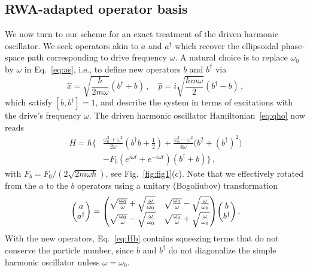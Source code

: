 \subsection{RWA-adapted operator basis}
We now turn to our scheme for an exact treatment of the driven harmonic oscillator. We seek operators akin to $a$ and $a^\dagger$ which recover the ellipsoidal phase-space path corresponding to drive frequency $\omega$. A natural choice is to replace $\omega_0$ by $\omega$ in Eq.~\eqref{eq:as}, i.e., to define new operators $b$ and $b^\dagger$ via
\begin{equation} \label{eq:bs}
\hat{x} =\sqrt{\frac{\hbar}{2m\omega}}(b^\dagger+b)\,, \quad \hat{p} = i\sqrt{\frac{\hbar m \omega}{2}}(b^\dagger - b)\,,
\end{equation}
which satisfy $[b, b^\dagger]=1$, and describe the system in terms of excitations with the drive's frequency $\omega$. The driven harmonic oscillator Hamiltonian~\eqref{eq:qho} now reads
\begin{align} 
H = \hbar \bigg\{ &\frac{\omega_0^2 + \omega^2}{2 \omega}  \left (b^\dagger b + \frac{1}{2} \right)+ \frac{\omega_0^2  - \omega^2}{4 \omega} \big(b^2 + (b^\dagger)^2  \big)\nonumber
\\ &- F_b(e^{i\omega t} +e^{-i\omega t})(b^\dagger+b) \bigg\} \,,\label{eq:Hb}
\end{align}
with $F_b = F_0 / (2 \sqrt{2 m \omega \hbar})$, see Fig.~\ref{fig:fig1}(c). Note that we effectively rotated from the $a$ to the $b$ operators using a unitary (Bogoliubov) transformation~\cite{Xiao_2009}
\begin{equation}
\mqty(a \\ a^\dagger) = \mqty( \sqrt{\frac{\omega_0}{\omega}} + \sqrt{\frac{\omega}{\omega_0}} & \sqrt{\frac{\omega_0}{\omega}} - \sqrt{\frac{\omega}{\omega_0}} \\ \sqrt{\frac{\omega_0}{\omega}} - \sqrt{\frac{\omega}{\omega_0}} & \sqrt{\frac{\omega_0}{\omega}} + \sqrt{\frac{\omega}{\omega_0}}) \mqty(b \\ b^\dagger) \,.
\end{equation}
With the new operators, Eq.~\eqref{eq:Hb} contains squeezing terms that do not conserve the particle number, since $b$ and $b^\dagger$ do not diagonalize the simple harmonic oscillator unless $\omega = \omega_0$. 

